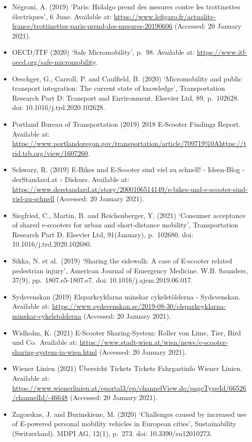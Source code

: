 \documentclass[
]{book}
\begin{document}
\begin{itemize}
\item
  Négroni, A. (2019) `Paris: Hidalgo prend des mesures contre les trottinettes électriques', 6 June. Available at: \url{https://www.lefigaro.fr/actualite-france/trottinettes-paris-prend-des-mesures-20190606} (Accessed: 20 January 2021).
\item
  OECD/ITF (2020) `Safe Micromobility', p.~98. Available at: \url{https://www.itf-oecd.org/safe-micromobility}.
\item
  Oeschger, G., Carroll, P. and Caulfield, B. (2020) `Micromobility and public transport integration: The current state of knowledge', Transportation Research Part D: Transport and Environment. Elsevier Ltd, 89, p.~102628. doi: 10.1016/j.trd.2020.102628.
\item
  Portland Bureau of Transportation (2019) 2018 E-Scooter Findings Report. Available at: \url{https://www.portlandoregon.gov/transportation/article/709719\%0Ahttps://trid.trb.org/view/1607260}.
\item
  Schwarz, R. (2019) E-Bikes und E-Scooter sind viel zu schnell! - Ideen-Blog - derStandard.at › Diskurs. Available at: \url{https://www.derstandard.at/story/2000106514149/e-bikes-und-e-scooter-sind-viel-zu-schnell} (Accessed: 20 January 2021).
\item
  Siegfried, C., Martin, B. and Reichenberger, Y. (2021) `Consumer acceptance of shared e-scooters for urban and short-distance mobility', Transportation Research Part D. Elsevier Ltd, 91(January), p.~102680. doi: 10.1016/j.trd.2020.102680.
\item
  Sikka, N. et al.~(2019) `Sharing the sidewalk: A case of E-scooter related pedestrian injury', American Journal of Emergency Medicine. W.B. Saunders, 37(9), pp.~1807.e5-1807.e7. doi: 10.1016/j.ajem.2019.06.017.
\item
  Sydsvenskan (2019) Elsparkcyklarna minskar cykelstölderna - Sydsvenskan. Available at: \url{https://www.sydsvenskan.se/2019-08-30/elsparkcyklarna-minskar-cykelstolderna} (Accessed: 20 January 2021).
\item
  Widholm, K. (2021) E-Scooter Sharing-System: Roller von Lime, Tier, Bird und Co.~Available at: \url{https://www.stadt-wien.at/wien/news/e-scooter-sharing-system-in-wien.html} (Accessed: 20 January 2021).
\item
  Wiener Linien (2021) Übersicht Tickets \textbar{} Tickets \textbar{} Fahrgastinfo \textbar{} Wiener Linien. Available at: \url{https://www.wienerlinien.at/eportal3/ep/channelView.do/pageTypeId/66526/channelId/-46648} (Accessed: 20 January 2021).
\item
  Zagorskas, J. and Burinskiene, M. (2020) `Challenges caused by increased use of E-powered personal mobility vehicles in European cities', Sustainability (Switzerland). MDPI AG, 12(1), p.~273. doi: 10.3390/su12010273.
\end{itemize}
\end{document}
